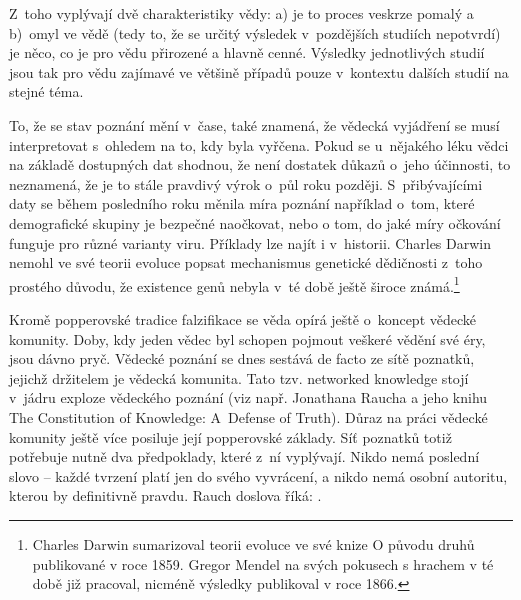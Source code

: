 \newpage

Z~toho vyplývají dvě charakteristiky vědy: a) je to proces veskrze pomalý a b)~omyl ve vědě (tedy to, že se určitý výsledek v~pozdějších studiích nepotvrdí) je něco, co je pro vědu přirozené a hlavně cenné. Výsledky jednotlivých studií jsou tak pro vědu zajímavé ve většině případů pouze v~kontextu dalších studií na stejné téma.

To, že se stav poznání mění v~čase, také znamená, že vědecká vyjádření se musí interpretovat s~ohledem na to, kdy byla vyřčena. Pokud se u~nějakého léku vědci na základě dostupných dat shodnou, že není dostatek důkazů o~jeho účinnosti, to neznamená, že je to stále pravdivý výrok o~půl roku později. S~přibývajícími daty se během posledního roku měnila míra poznání například o~tom, které demografické skupiny je bezpečné naočkovat, nebo o tom, do jaké míry očkování funguje pro různé varianty viru. Příklady lze najít i v~historii. Charles Darwin nemohl ve své teorii evoluce popsat mechanismus genetické dědičnosti z~toho prostého důvodu, že existence genů nebyla v~té době ještě široce známá.\footnote{Charles Darwin sumarizoval teorii evoluce ve své knize O původu druhů publikované v roce 1859. Gregor Mendel na svých pokusech s hrachem v té době již pracoval, nicméně výsledky publikoval v roce 1866.}

Kromě popperovské tradice falzifikace se věda opírá ještě o~koncept vědecké komunity. Doby, kdy jeden vědec byl schopen pojmout veškeré vědění své éry, jsou dávno pryč. Vědecké poznání se dnes sestává de facto ze sítě poznatků, jejichž držitelem je vědecká komunita. Tato tzv. networked knowledge stojí v~jádru exploze vědeckého poznání (viz např. Jonathana Raucha a jeho knihu The Constitution of Knowledge: A~Defense of Truth). Důraz na práci vědecké komunity ještě více posiluje její popperovské základy. Síť poznatků totiž potřebuje nutně dva předpoklady, které z~ní vyplývají. Nikdo nemá poslední slovo -- každé tvrzení platí jen do svého vyvrácení, a nikdo nemá osobní autoritu, kterou by definitivně  pravdu. Rauch doslova říká:  \cite{Rauch2021}.

